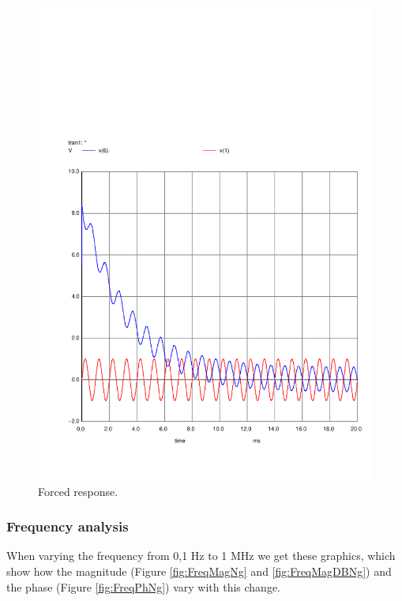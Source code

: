 \begin{figure}[H] \centering
    \includegraphics[width=0.9\linewidth]{../Simulation/trans_forc.pdf}
    \caption{Forced response.}
    \label{fig:ForNg}
\end{figure}




\subsubsection{Frequency analysis}

\indent

When varying the frequency from 0,1 Hz to 1 MHz we get these graphics, which show how the magnitude (Figure \ref{fig:FreqMagNg} and \ref{fig:FreqMagDBNg}) and the phase (Figure \ref{fig:FreqPhNg}) vary with this change.

